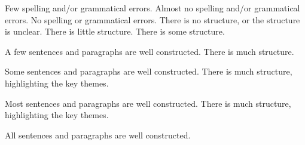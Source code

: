 \documentclass{../../fal_assignment}
\begin{document}
\begin{markingrubric}
        \grade 		Few spelling and/or grammatical errors.
        \grade 		Almost no spelling and/or grammatical errors.
        \grade 		No spelling or grammatical errors.
%
        \grade\fail 	There is no structure, or the structure is unclear.
        \grade 		There is little structure.
        \grade 		There is some structure.
        \par 		A few sentences and paragraphs are well constructed.
        \grade 		There is much structure.
        \par 		Some sentences and paragraphs are well constructed.
        \grade 		There is much structure, highlighting the key themes.
        \par 		Most sentences and paragraphs are well constructed.
        \grade 		There is much structure, highlighting the key themes.
        \par 		All sentences and paragraphs are well constructed.
\end{markingrubric}
\end{document}
